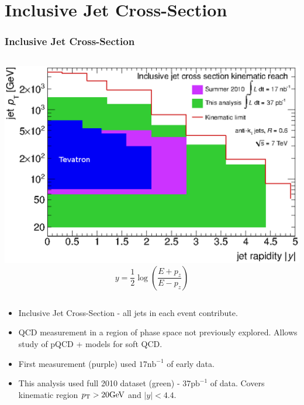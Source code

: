 \documentclass[10pt]{beamer}
\begin{document}
\section{Inclusive Jet Cross-Section}
\begin{frame}\frametitle{Inclusive Jet Cross-Section}
\begin{columns}
\includegraphics[width=1.0\linewidth,angle=0]{KinematicRangeTevatron.eps}
\begin{equation*}
y = \frac{1}{2} \log \left(\frac{E + p_z}{E - p_z}\right)
\end{equation*}
\end{columns}
\begin{itemize}
\item Inclusive Jet Cross-Section -  all jets in each event contribute.
\item QCD measurement in a region of phase space not previously explored. Allows study of pQCD + models for soft QCD.
\item First \atlas measurement (purple) used $17 \mathrm{nb}^{-1}$ of early data.
\item This analysis used full 2010 dataset (green) - $37 \mathrm{pb}^{-1}$ of data. Covers kinematic region $p_{\mathrm{T}} > 20 \mathrm{GeV}$ and  $|y| < 4.4$.
\end{itemize}
\end{frame}
\end{document}
